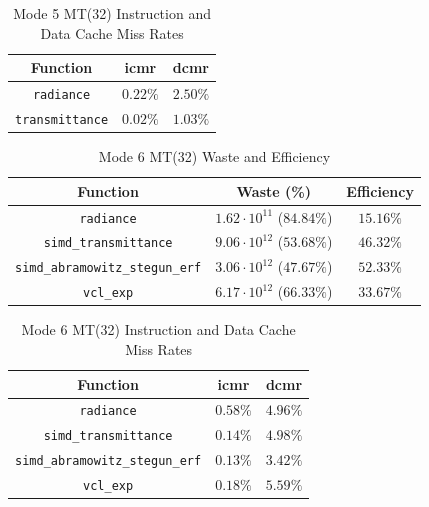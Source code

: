 \documentclass[a4paper, 11pt]{memoir}
\begin{document}
    \begin{table}[ht]
        \centering
        \begin{tabular}{|c|c|c|}
            \hline
            Function                        & icmr     & dcmr\\\hline
            \texttt{radiance}      & $0.22\%$ & $2.50\%$\\
            \texttt{transmittance} & $0.02\%$ & $1.03\%$ \\
            \hline
        \end{tabular}
        \caption{Mode 5 MT(32) Instruction and Data Cache Miss Rates}
        \label{tab:mode_5_mt_cmr}
    \end{table}

    \begin{table}[ht]
        \centering
        \begin{tabular}{|c|c|c|}
            \hline
            Function                                     & Waste (\%)                       & Efficiency\\\hline
            \texttt{radiance}                   & $1.62 \cdot 10^{11}$ ($84.84\%$) & $15.16\%$\\
            \texttt{simd_transmittance}         & $9.06 \cdot 10^{12}$ ($53.68\%$) & $46.32\%$\\
            \texttt{simd_abramowitz_stegun_erf} & $3.06 \cdot 10^{12}$ ($47.67\%$) & $52.33\%$\\
            \texttt{vcl_exp}                    & $6.17 \cdot 10^{12}$ ($66.33\%$) & $33.67\%$\\
            \hline
        \end{tabular}
        \caption{Mode 6 MT(32) Waste and Efficiency}
        \label{tab:mode_6_mt_wae}
    \end{table}

    \begin{table}[ht]
        \centering
        \begin{tabular}{|c|c|c|}
            \hline
            Function                                     & icmr     & dcmr\\\hline
            \texttt{radiance}                   & $0.58\%$ & $4.96\%$\\
            \texttt{simd_transmittance}         & $0.14\%$ & $4.98\%$\\
            \texttt{simd_abramowitz_stegun_erf} & $0.13\%$ & $3.42\%$\\
            \texttt{vcl_exp}                    & $0.18\%$ & $5.59\%$\\
            \hline
        \end{tabular}
        \caption{Mode 6 MT(32) Instruction and Data Cache Miss Rates}
        \label{tab:mode_6_mt_cmr}
    \end{table}
\end{document}

